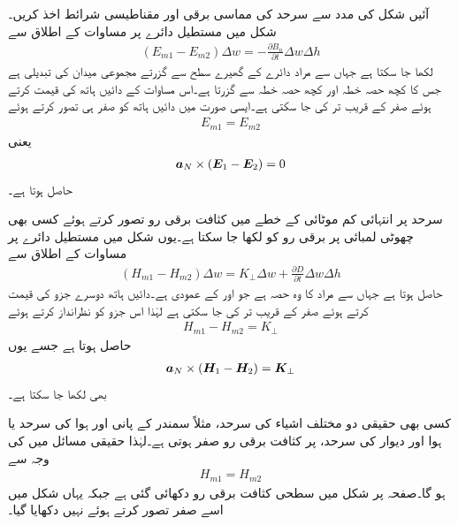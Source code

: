 آئیں شکل   کی مدد سے  سرحد کی  مماسی  برقی اور مقناطیسی شرائط اخذ  کریں۔ شکل میں مستطیل دائرے پر مساوات  کے اطلاق سے
\begin{align*}
\left(E_{m1}-E_{m2}\right) \Delta w=-\frac{\partial B_{n}}{\partial t}  \Delta w \Delta h
\end{align*}  
لکھا جا سکتا ہے جہاں  سے مراد دائرے کے گھیرے سطح سے گزرتے مجموعی میدان کی تبدیلی ہے جس کا کچھ حصہ خطہ  اور کچھ حصہ خطہ  سے گزرتا ہے۔اس مساوات کے دائیں ہاتھ کی قیمت  کرتے ہوئے صفر کے قریب تر کی جا سکتی ہے۔ایسی صورت میں دائیں ہاتھ کو صفر ہی تصور کرتے ہوئے
\begin{align}\label{مساوات_میکس_ویل_سرحدی_شرائط_بدلتے_میدان_الف}
E_{m1}=E_{m2}
\end{align}
یعنی
\begin{align}
{\boldsymbol{a}}_N \times \left({{\boldsymbol{E}}}_1-{{\boldsymbol{E}}}_2 \right)=0
\end{align}
حاصل ہوتا ہے۔

سرحد پر انتہائی کم موٹائی کے خطے میں کثافت برقی رو  تصور کرتے ہوئے کسی بھی چھوٹی لمبائی  پر برقی رو کو  لکھا جا سکتا ہے۔یوں شکل  میں مستطیل دائرے پر مساوات  کے اطلاق سے
\begin{align*}
\left(H_{m1}-H_{m2} \right) \Delta w=K_\perp \Delta w +\frac{\partial D}{\partial t} \Delta w \Delta h
\end{align*}
حاصل ہوتا ہے جہاں  سے مراد  کا وہ حصہ ہے جو  اور  کے عمودی ہے۔دائیں ہاتھ دوسرے جزو کی قیمت  کرتے ہوئے صفر کے قریب تر کی جا سکتی ہے لہٰذا اس جزو کو نظرانداز کرتے ہوئے
\begin{align}\label{مساوات_میکس_ویل_متوازی_مقناطیسی_موج_سرحدی_شرط}
H_{m1}-H_{m2}=K_\perp
\end{align}
حاصل ہوتا ہے جسے یوں
\begin{align}
{\boldsymbol{a}}_N \times \left({{\boldsymbol{H}}}_1-{{\boldsymbol{H}}}_2 \right)={{\boldsymbol{K}}}_\perp
\end{align}
بھی لکھا جا سکتا ہے۔

کسی بھی حقیقی دو مختلف اشیاء کی سرحد، مثلاً سمندر کے پانی اور ہوا کی سرحد یا ہوا اور دیوار کی سرحد، پر کثافت برقی رو  صفر ہوتی ہے۔لہٰذا حقیقی مسائل میں  کی وجہ سے 
\begin{align}\label{مساوات_میکس_ویل_سرحدی_شرائط_بدلتے_میدان_ب}
H_{m1}=H_{m2}
\end{align}
ہو گا۔صفحہ  پر شکل  میں سطحی کثافت برقی رو  دکھائی گئی ہے جبکہ یہاں شکل  میں اسے صفر تصور کرتے ہوئے نہیں دکھایا گیا۔

